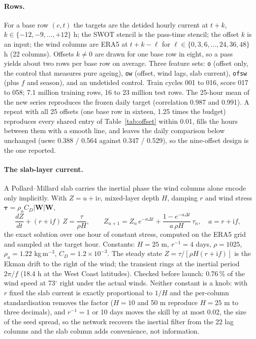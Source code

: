 \documentclass[11pt]{article}
\newcommand{\code}[1]{\texttt{#1}}
\begin{document}
\paragraph{Rows.} For a base row $(c, t)$ the targets are the detided hourly current at $t + k$, $k \in \{-12, -9, \dots, +12\}$ h; the SWOT stencil is the pass-time stencil; the offset $k$ is an input; the wind columns are ERA5 at $t + k - \ell$ for $\ell \in \{0, 3, 6, \dots, 24, 36, 48\}$ h (22 columns). Offsets $k \ne 0$ are drawn for one base row in eight, so a pass yields about two rows per base row on average. Three feature sets: \code{o} (offset only, the control that measures pure ageing), \code{ow} (offset, wind lags, slab current), \code{ofsw} (plus $f$ and season), and an undetided control. Train cycles 001 to 016, score 017 to 058; 7.1 million training rows, 16 to 23 million test rows. The 25-hour mean of the new series reproduces the frozen daily target (correlation 0.987 and 0.991). A repeat with all 25 offsets (one base row in sixteen, 1.25 times the budget) reproduces every shared entry of Table~\ref{tab:offset} within 0.01, fills the hours between them with a smooth line, and leaves the daily comparison below unchanged (uswc 0.388 / 0.564 against 0.347 / 0.529), so the nine-offset design is the one reported.

\paragraph{The slab-layer current.} A Pollard--Millard slab \citep{pollard1970slab} carries the inertial phase the wind columns alone encode only implicitly. With $Z = u + \mathrm{i}v$, mixed-layer depth $H$, damping $r$ and wind stress $\boldsymbol\tau = \rho_a C_D |\mathbf{W}|\mathbf{W}$,
\begin{equation}
\frac{dZ}{dt} + (r + \mathrm{i}f)\,Z = \frac{\tau}{\rho H},
\qquad
Z_{n+1} = Z_n\,e^{-a\Delta t} + \frac{1 - e^{-a\Delta t}}{a\,\rho H}\,\tau_n,\quad a = r + \mathrm{i}f,
\label{eq:slabstep}
\end{equation}
the exact solution over one hour of constant stress, computed on the ERA5 grid and sampled at the target hour. Constants: $H = 25$ m, $r^{-1} = 4$ days, $\rho = 1025$, $\rho_a = 1.22$ kg\,m$^{-3}$, $C_D = 1.2\times10^{-3}$. The steady state $Z = \tau/[\rho H (r + \mathrm{i}f)]$ is the Ekman drift to the right of the wind; the transient rings at the inertial period $2\pi/f$ (18.4 h at the West Coast latitudes). Checked before launch: 0.76\,\% of the wind speed at 73$^\circ$ right under the actual winds. Neither constant is a knob: with $r$ fixed the slab current is exactly proportional to $1/H$ and the per-column standardisation removes the factor ($H = 10$ and 50 m reproduce $H = 25$ m to three decimals), and $r^{-1} = 1$ or 10 days moves the skill by at most 0.02, the size of the seed spread, so the network recovers the inertial filter from the 22 lag columns and the slab column adds convenience, not information.
\end{document}

